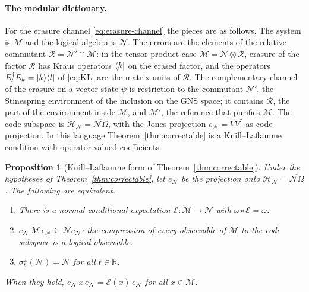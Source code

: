 \documentclass[a4paper,11pt]{article}
\newtheorem{proposition}[theorem]{Proposition}
\theoremstyle{definition}
\newcommand{\mR}{\mathcal{R}}
\newcommand{\mN}{\mathcal{N}}
\newcommand{\mH}{\mathcal{H}}
\newcommand{\mM}{\mathcal{M}}
\newcommand{\mE}{\mathcal{E}}
\begin{document}
\paragraph{The modular dictionary.}
For the erasure channel \eqref{eq:erasure-channel} the pieces are as follows. The system is $\mM$ and the logical algebra is $\mN$. The errors are the elements of the relative commutant $\mR=\mN'\cap\mM$: in the tensor-product case $\mM=\mN\overline\otimes\mR$, erasure of the factor $\mR$ has Kraus operators $\bra{k}$ on the erased factor, and the operators $E_l^\dagger E_k=\ket{k}\!\bra{l}$ of \eqref{eq:KL} are the matrix units of $\mR$. The complementary channel of the erasure on a vector state $\psi$ is restriction to the commutant $\mN'$, the Stinespring environment of the inclusion on the GNS space; it contains $\mR$, the part of the environment inside $\mM$, and $\mM'$, the reference that purifies $\mM$. The code subspace is $\mH_{\mN}=\overline{\mN\Omega}$, with the Jones projection $e_{\mN}=VV^*$ as code projection. In this language Theorem~\ref{thm:correctable} is a Knill--Laflamme condition with operator-valued coefficients.

\begin{proposition}[Knill--Laflamme form of Theorem~\ref{thm:correctable}]\label{prop:KL}
Under the hypotheses of Theorem~\ref{thm:correctable}, let $e_{\mN}$ be the projection onto $\mH_{\mN}=\overline{\mN\Omega}$. The following are equivalent.
\begin{enumerate}
 \item[\rm(i)] There is a normal conditional expectation $\mE:\mM\to\mN$ with $\omega\circ\mE=\omega$.
 \item[\rm(ii)] $e_{\mN}\,\mM\,e_{\mN}\subseteq\mN e_{\mN}$: the compression of every observable of $\mM$ to the code subspace is a logical observable.
 \item[\rm(iii)] $\sigma^\omega_t(\mN)=\mN$ for all $t\in\mathbb R$.
\end{enumerate}
When they hold, $e_{\mN}\,x\,e_{\mN}=\mE(x)\,e_{\mN}$ for all $x\in\mM$.
\end{proposition}
\end{document}

